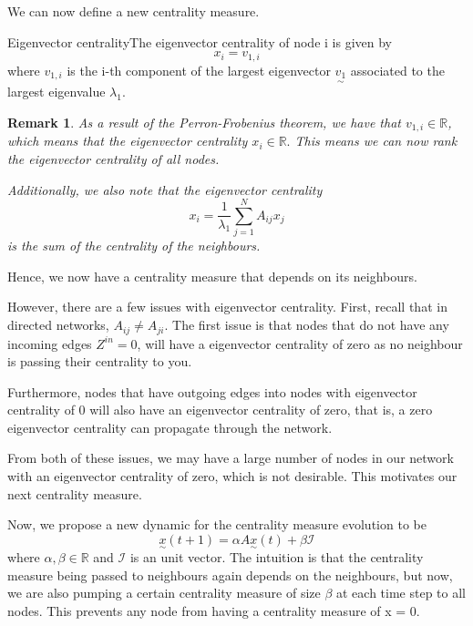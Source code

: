 \documentclass[twoside]{article}
\newcommand{\utilde}{\underset{\sim}}
\newtheorem{remark}[theorem]{Remark}
\begin{document}
We can now define a new centrality measure.

\begin{definition_exam}{Eigenvector centrality}{}The eigenvector centrality of node i is given by 
$$
x_i = v_{1, i}
$$
where $v_{1, i}$ is the i-th component of the largest eigenvector $\utilde{v_1}$ associated to the largest eigenvalue $\lambda_1.$
\end{definition_exam}

\begin{remark}As a result of the Perron-Frobenius theorem, we have that $v_{1,i} \in \mathbb{R}$, which means that the eigenvector centrality $x_i \in \mathbb{R}.$ 
This means we can now rank the eigenvector centrality of all nodes.

Additionally, we also note that the eigenvector centrality
$$
x_i = \frac{1}{\lambda_1}\sum_{j=1}^{N}A_{ij}x_j
$$
is the sum of the centrality of the neighbours.
\end{remark}

Hence, we now have a centrality measure that depends on its neighbours.

However, there are a few issues with eigenvector centrality. First, recall that in directed networks, $A_{ij} \neq A_{ji}.$ The first issue is that nodes that do not have any incoming edges $Z^{in} = 0$, will have a eigenvector centrality of zero as no neighbour is passing their centrality to you.

Furthermore, nodes that have outgoing edges into nodes with eigenvector centrality of 0 will also have an eigenvector centrality of zero, that is, a zero eigenvector centrality can propagate through the network.

From both of these issues, we may have a large number of nodes in our network with an eigenvector centrality of zero, which is not desirable. This motivates our next centrality measure.

Now, we propose a new dynamic for the centrality measure evolution to be 
\begin{equation}
\utilde{x}(t + 1) = \alpha A \utilde{x}(t) + \beta \mathcal{I}
\tag{**}
\end{equation}
where $\alpha, \beta \in \mathbb{R}$ and $\mathcal{I}$ is an unit vector. The intuition is that the centrality measure being passed to neighbours again depends on the neighbours, but now, we are also pumping a certain centrality measure of size $\beta$ at each time step to all nodes. This prevents any node from having a centrality measure of x = 0.
\end{document}
